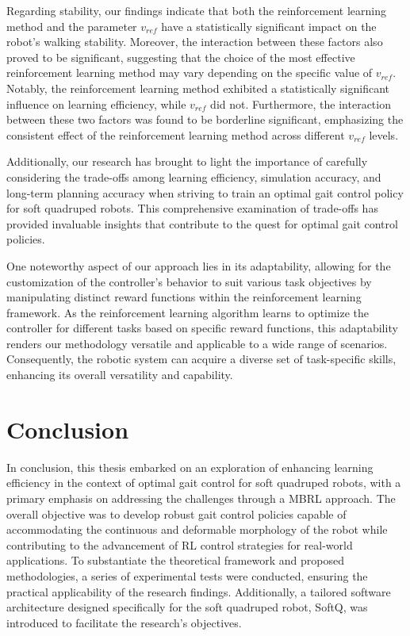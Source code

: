 Regarding stability, our findings indicate that both the reinforcement learning method and the parameter $v_{ref}$ have a statistically significant impact on the robot's walking stability. Moreover, the interaction between these factors also proved to be significant, suggesting that the choice of the most effective reinforcement learning method may vary depending on the specific value of $v_{ref}$. Notably, the reinforcement learning method exhibited a statistically significant influence on learning efficiency, while $v_{ref}$ did not. Furthermore, the interaction between these two factors was found to be borderline significant, emphasizing the consistent effect of the reinforcement learning method across different $v_{ref}$ levels.

Additionally, our research has brought to light the importance of carefully considering the trade-offs among learning efficiency, simulation accuracy, and long-term planning accuracy when striving to train an optimal gait control policy for soft quadruped robots. This comprehensive examination of trade-offs has provided invaluable insights that contribute to the quest for optimal gait control policies.

One noteworthy aspect of our approach lies in its adaptability, allowing for the customization of the controller's behavior to suit various task objectives by manipulating distinct reward functions within the reinforcement learning framework. As the reinforcement learning algorithm learns to optimize the controller for different tasks based on specific reward functions, this adaptability renders our methodology versatile and applicable to a wide range of scenarios. Consequently, the robotic system can acquire a diverse set of task-specific skills, enhancing its overall versatility and capability.

\section{Conclusion}
In conclusion, this thesis embarked on an exploration of enhancing learning efficiency in the context of optimal gait control for soft quadruped robots, with a primary emphasis on addressing the challenges through a MBRL approach. The overall objective was to develop robust gait control policies capable of accommodating the continuous and deformable morphology of the robot while contributing to the advancement of RL control strategies for real-world applications. To substantiate the theoretical framework and proposed methodologies, a series of experimental tests were conducted, ensuring the practical applicability of the research findings. Additionally, a tailored software architecture designed specifically for the soft quadruped robot, SoftQ, was introduced to facilitate the research's objectives.

